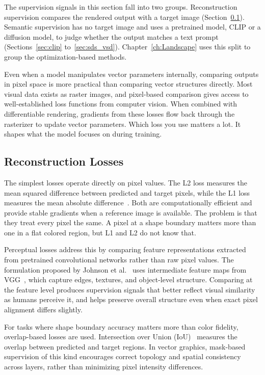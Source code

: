 The supervision signals in this section fall into two groups. 
Reconstruction supervision compares the rendered output with a 
target image (Section~\ref{sec:recon_losses}). Semantic supervision 
has no target image and uses a pretrained model, CLIP or a diffusion 
model, to judge whether the output matches a text prompt 
(Sections~\ref{sec:clip} to~\ref{sec:sds_vsd}). 
Chapter~\ref{ch:Landscape} uses this split to group the 
optimization-based methods.

Even when a model manipulates vector parameters internally, 
comparing outputs in pixel space is more practical than 
comparing vector structures directly. Most visual data exists 
as raster images, and pixel-based comparison gives access to 
well-established loss functions from computer vision. When 
combined with differentiable rendering, gradients from these 
losses flow back through the rasterizer to update vector 
parameters. Which loss you use matters a lot. It shapes 
what the model focuses on during training.

\subsection{Reconstruction Losses}
\label{sec:recon_losses}

The simplest losses operate directly on pixel values. The L2 
loss measures the mean squared difference between predicted 
and target pixels, while the L1 loss measures the mean 
absolute difference~\cite{goodfellow2016deep}. Both are 
computationally efficient and provide stable gradients when 
a reference image is available. The problem is that they treat 
every pixel the same. A pixel at a shape boundary matters more
than one in a flat colored region, but L1 and L2 do not know that.

Perceptual losses address this by comparing feature 
representations extracted from pretrained convolutional 
networks rather than raw pixel values. The formulation 
proposed by Johnson et al.~\cite{johnsonPerceptualLossesRealTime2016} 
uses intermediate feature maps from VGG~\cite{simonyan2015very}, 
which capture edges, textures, and object-level structure. 
Comparing at the feature level produces supervision signals 
that better reflect visual similarity as humans perceive it, 
and helps preserve overall structure even when exact pixel 
alignment differs slightly.

For tasks where shape boundary accuracy matters more than 
color fidelity, overlap-based losses are used. Intersection 
over Union (IoU)~\cite{everingham2010pascal} measures the 
overlap between predicted and target regions. In vector 
graphics, mask-based supervision of this kind encourages 
correct topology and spatial consistency across layers, 
rather than minimizing pixel intensity differences.


